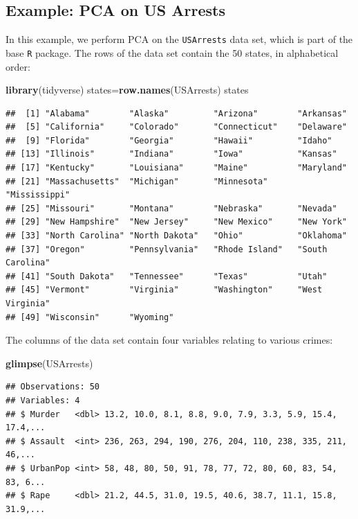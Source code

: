 \documentclass[openany]{book}
\newenvironment{Shaded}{\begin{snugshade}}{\end{snugshade}}
\newcommand{\KeywordTok}[1]{\textcolor[rgb]{0.13,0.29,0.53}{\textbf{#1}}}
\newcommand{\NormalTok}[1]{#1}
\begin{document}
\hypertarget{example-pca-on-us-arrests}{%
\subsection{Example: PCA on US Arrests}\label{example-pca-on-us-arrests}}

In this example, we perform PCA on the \texttt{USArrests} data set, which is part of
the base \texttt{R} package. The rows of the data set contain the 50 states, in
alphabetical order:

\begin{Shaded}
\begin{Highlighting}[]
\KeywordTok{library}\NormalTok{(tidyverse)}
\NormalTok{states=}\KeywordTok{row.names}\NormalTok{(USArrests)}
\NormalTok{states}
\end{Highlighting}
\end{Shaded}

\begin{verbatim}
##  [1] "Alabama"        "Alaska"         "Arizona"        "Arkansas"      
##  [5] "California"     "Colorado"       "Connecticut"    "Delaware"      
##  [9] "Florida"        "Georgia"        "Hawaii"         "Idaho"         
## [13] "Illinois"       "Indiana"        "Iowa"           "Kansas"        
## [17] "Kentucky"       "Louisiana"      "Maine"          "Maryland"      
## [21] "Massachusetts"  "Michigan"       "Minnesota"      "Mississippi"   
## [25] "Missouri"       "Montana"        "Nebraska"       "Nevada"        
## [29] "New Hampshire"  "New Jersey"     "New Mexico"     "New York"      
## [33] "North Carolina" "North Dakota"   "Ohio"           "Oklahoma"      
## [37] "Oregon"         "Pennsylvania"   "Rhode Island"   "South Carolina"
## [41] "South Dakota"   "Tennessee"      "Texas"          "Utah"          
## [45] "Vermont"        "Virginia"       "Washington"     "West Virginia" 
## [49] "Wisconsin"      "Wyoming"
\end{verbatim}

The columns of the data set contain four variables relating to various crimes:

\begin{Shaded}
\begin{Highlighting}[]
\KeywordTok{glimpse}\NormalTok{(USArrests)}
\end{Highlighting}
\end{Shaded}

\begin{verbatim}
## Observations: 50
## Variables: 4
## $ Murder   <dbl> 13.2, 10.0, 8.1, 8.8, 9.0, 7.9, 3.3, 5.9, 15.4, 17.4,...
## $ Assault  <int> 236, 263, 294, 190, 276, 204, 110, 238, 335, 211, 46,...
## $ UrbanPop <int> 58, 48, 80, 50, 91, 78, 77, 72, 80, 60, 83, 54, 83, 6...
## $ Rape     <dbl> 21.2, 44.5, 31.0, 19.5, 40.6, 38.7, 11.1, 15.8, 31.9,...
\end{verbatim}
\end{document}
